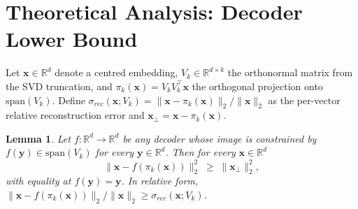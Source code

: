 \documentclass[11pt,a4paper]{article}
\newtheorem{lemma}{Lemma}
\begin{document}
\begin{table}[tb]
\centering
\caption{CKKS configurations on the test workload (one batched ct-pt
reranking operation). All rows sit within the conservative \texttt{tc128}
($\geq 128$-bit) bound of the HomomorphicEncryption.org tables for the stated
$N_{\mathrm{poly}}$.}
\label{tab:ckks-configs}
\small
{}
\end{table}

\section{Theoretical Analysis: Decoder Lower Bound}\label{sec:lemma}

Let $\mathbf{x} \in \mathbb{R}^d$ denote a centred embedding,
$V_k \in \mathbb{R}^{d \times k}$ the orthonormal matrix from the SVD
truncation, and $\pi_k(\mathbf{x}) = V_k V_k^\top \mathbf{x}$ the
orthogonal projection onto $\mathrm{span}(V_k)$.
Define
$\sigma_{rec}(\mathbf{x}; V_k) =
\| \mathbf{x} - \pi_k(\mathbf{x}) \|_2 / \|\mathbf{x}\|_2$
as the per-vector relative reconstruction error and
$\mathbf{x}_\perp = \mathbf{x} - \pi_k(\mathbf{x})$.

\begin{lemma}\label{lemma:proj-l2}
Let $f : \mathbb{R}^d \to \mathbb{R}^d$ be any decoder whose image is
constrained by $f(\mathbf{y}) \in \mathrm{span}(V_k)$ for every
$\mathbf{y} \in \mathbb{R}^d$. Then for every
$\mathbf{x} \in \mathbb{R}^d$
\[
\| \mathbf{x} - f(\pi_k(\mathbf{x})) \|_2^{2}
\;\geq\; \| \mathbf{x}_\perp \|_2^{2},
\]
with equality at $f(\mathbf{y}) = \mathbf{y}$. In relative form,
$\| \mathbf{x} - f(\pi_k(\mathbf{x})) \|_2 / \|\mathbf{x}\|_2
\geq \sigma_{rec}(\mathbf{x}; V_k)$.
\end{lemma}
\end{document}
